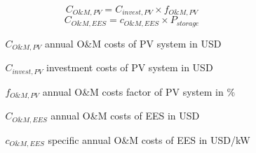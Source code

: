 \begin{equation}
C_{O\&M,PV} = C_{invest,PV} \times f_{O\&M,PV}
\end{equation} 
\begin{equation}
C_{O\&M,EES} = c_{O\&M,EES} \times P_{storage}
\end{equation} 
\begin{itemize}
\item[ ] 
\begin{itemize}
\item[ ] 
\begin{itemize}
\item[$C_{O\&M,PV}$]annual O\&M costs of PV system in USD
\item[$C_{invest,PV}$]investment costs of PV system in USD
\item[$f_{O\&M,PV}$]annual O\&M costs factor of PV system in \%
\item[$C_{O\&M,EES}$]annual O\&M costs of EES in USD
\item[$c_{O\&M,EES}$]specific annual O\&M costs of EES in USD/kW
\end{itemize}
\end{itemize}
\end{itemize}
 
\pagebreak